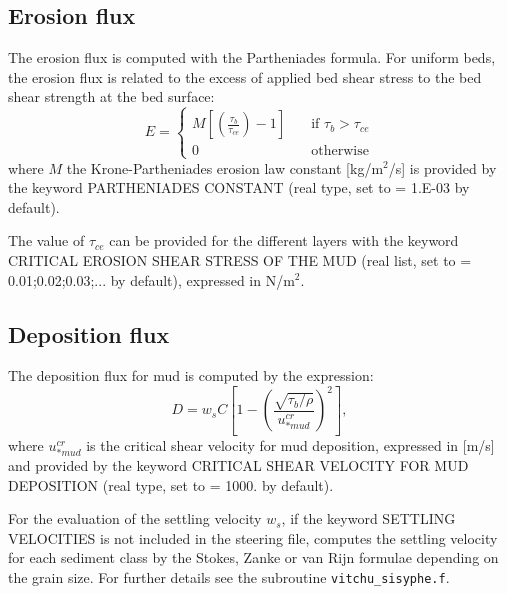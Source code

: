 \subsection{Erosion flux}
The erosion flux is computed with the Partheniades formula. For uniform beds, the erosion flux is related to the excess of
applied bed shear stress to the bed shear strength at the bed surface:
\begin{equation*}
E = \left\{\begin{array}{ll}
M\left[\left(\frac{\tau_b}{\tau_{ce}}\right)-1\right]\quad & \text{if}\,\,\tau_b> \tau_{ce}\\  
0\quad & \text{otherwise}
\end{array}
\right. 
\end{equation*}
where $M$ the Krone-Partheniades erosion law constant [kg/m$^2$/s] is provided by the keyword {\ttfamily PARTHENIADES CONSTANT} (real type, set to {\ttfamily = 1.E-03} by default).

The value of $\tau_{ce}$ can be provided for the different layers with the keyword {\ttfamily CRITICAL EROSION SHEAR STRESS OF THE MUD} (real list, set to {\ttfamily = 0.01;0.02;0.03;...} by default), expressed in N/m$^2$.

\subsection{Deposition flux}
The deposition flux for mud is computed by the expression:
\begin{equation}
D = w_{s} C \left[1-\left(\frac{\sqrt{\tau_b/\rho}}{u_{*mud}^{cr}}\right)^2 \right],
\end{equation}
where $u_{*mud}^{cr}$ is the critical shear velocity for mud deposition, expressed in [m/s] and provided by the keyword {\ttfamily CRITICAL SHEAR VELOCITY FOR MUD DEPOSITION} (real type, set to {\ttfamily = 1000.} by default).

For the evaluation of the settling velocity $w_s $, if the keyword {\ttfamily SETTLING VELOCITIES} is not included in the steering file, \sisyphe{} computes the settling velocity for each sediment class by the Stokes, Zanke or van Rijn formulae depending on the grain size. For further details see the subroutine \texttt{vitchu\_sisyphe.f}.

